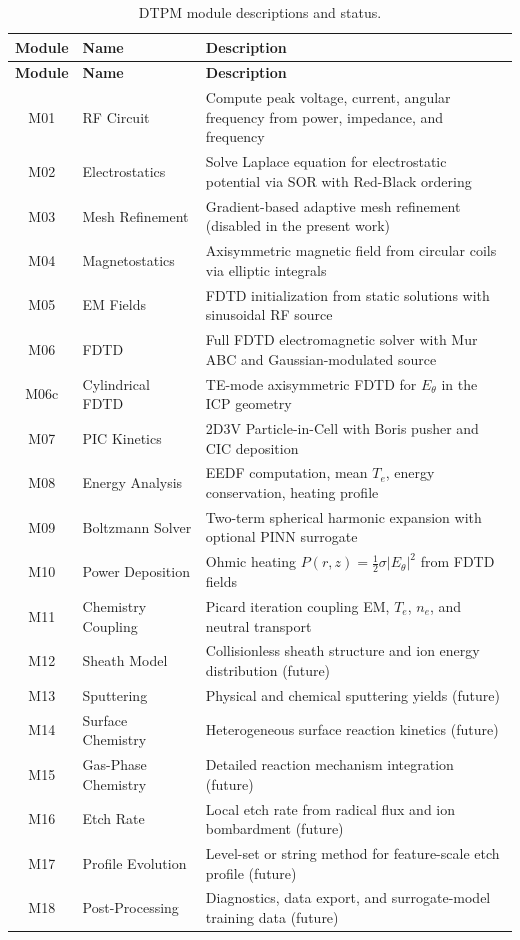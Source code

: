 \documentclass[11pt,a4paper]{report}
\begin{document}
\begin{longtable}{clp{8.5cm}}
\caption{DTPM module descriptions and status.} \label{tab:module-descriptions} \\
\toprule
\textbf{Module} & \textbf{Name} & \textbf{Description} \\
\midrule
\endfirsthead
\toprule
\textbf{Module} & \textbf{Name} & \textbf{Description} \\
\midrule
\endhead
M01 & RF Circuit        & Compute peak voltage, current, angular frequency from power, impedance, and frequency \\
M02 & Electrostatics    & Solve Laplace equation for electrostatic potential via SOR with Red-Black ordering \\
M03 & Mesh Refinement   & Gradient-based adaptive mesh refinement (disabled in the present work) \\
M04 & Magnetostatics    & Axisymmetric magnetic field from circular coils via elliptic integrals \\
M05 & EM Fields         & FDTD initialization from static solutions with sinusoidal RF source \\
M06 & FDTD              & Full FDTD electromagnetic solver with Mur ABC and Gaussian-modulated source \\
M06c & Cylindrical FDTD & TE-mode axisymmetric FDTD for $E_\theta$ in the ICP geometry \\
M07 & PIC Kinetics      & 2D3V Particle-in-Cell with Boris pusher and CIC deposition \\
M08 & Energy Analysis   & EEDF computation, mean $T_e$, energy conservation, heating profile \\
M09 & Boltzmann Solver  & Two-term spherical harmonic expansion with optional PINN surrogate \\
M10 & Power Deposition  & Ohmic heating $P(r,z) = \frac{1}{2}\sigma|E_\theta|^2$ from FDTD fields \\
M11 & Chemistry Coupling & Picard iteration coupling EM, $T_e$, $n_e$, and neutral transport \\
M12 & Sheath Model      & Collisionless sheath structure and ion energy distribution (future) \\
M13 & Sputtering        & Physical and chemical sputtering yields (future) \\
M14 & Surface Chemistry & Heterogeneous surface reaction kinetics (future) \\
M15 & Gas-Phase Chemistry & Detailed reaction mechanism integration (future) \\
M16 & Etch Rate         & Local etch rate from radical flux and ion bombardment (future) \\
M17 & Profile Evolution & Level-set or string method for feature-scale etch profile (future) \\
M18 & Post-Processing   & Diagnostics, data export, and surrogate-model training data (future) \\
\bottomrule
\end{longtable}
\end{document}
